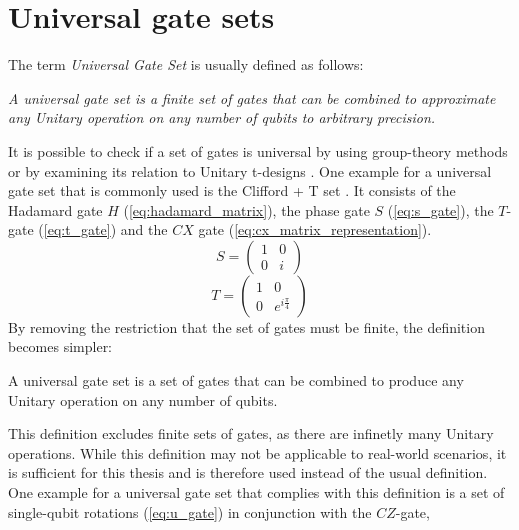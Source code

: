 \section{Universal gate sets} \label{sec:universal_gateset}
	The term \textit{Universal Gate Set} is usually defined as follows:
	\begin{definitionbox}
		\textit{A universal gate set is a finite set of gates that can be combined to approximate any Unitary operation on any number of qubits to arbitrary precision.} \cite{Nielsen2010-xd}
	\end{definitionbox}
	It is possible to check if a set of gates is universal by using group-theory methods \cite{Sawicki_2017} or by examining its relation to Unitary t-designs \cite{Sawicki_2022}. One example for a universal gate set that is commonly used is the Clifford + T set \cite{vandaele2024optimal}. It consists of the Hadamard gate $H$ (\ref{eq:hadamard_matrix}), the phase gate $S$ (\ref{eq:s_gate}), the $T$-gate (\ref{eq:t_gate}) and the $CX$ gate (\ref{eq:cx_matrix_representation}). 
	\begin{equation}
		\label{eq:s_gate}
		S=
		\begin{pmatrix}
			1 & 0 \\
			0 & i
		\end{pmatrix}
	\end{equation}
	\begin{equation}
		\label{eq:t_gate}
		T=
		\begin{pmatrix}
			1 & 0 \\
			0 & e^{i\frac{\pi}{4}}
		\end{pmatrix}
	\end{equation}
	By removing the restriction that the set of gates must be finite, the definition becomes simpler:
	\begin{definitionbox}
		\begin{definition}
			\label{def:universal_gate_set}
			A universal gate set is a set of gates that can be combined to produce any Unitary operation on any number of qubits.
		\end{definition}
	\end{definitionbox}
	This definition excludes finite sets of gates, as there are infinetly many Unitary operations. While this definition may not be applicable to real-world scenarios, it is sufficient for this thesis and is therefore used instead of the usual definition.
	One example for a universal gate set that complies with this definition is a set of single-qubit rotations (\ref{eq:u_gate}) in conjunction with the $CZ$-gate,
